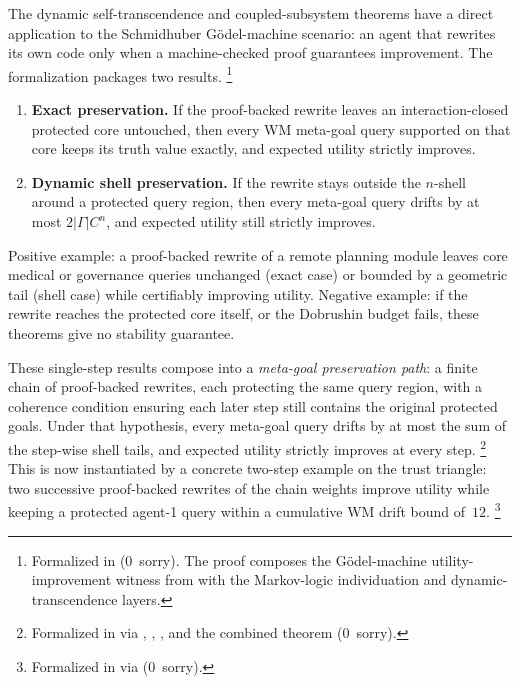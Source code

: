 \documentclass[11pt,openany]{report}
\begin{document}
The dynamic self-transcendence and coupled-subsystem theorems have a direct
application to the Schmidhuber
G\"odel-machine scenario: an agent that rewrites its own code only when a
machine-checked proof guarantees improvement.  The formalization packages
two results.%
\footnote{Formalized in
(0~sorry).  The proof composes the G\"odel-machine utility-improvement
witness from 
with the Markov-logic individuation and dynamic-transcendence layers.}
\begin{enumerate}
\item \textbf{Exact preservation.}
  If the proof-backed rewrite leaves an interaction-closed protected core
  untouched, then every WM meta-goal query supported on that core keeps
  its truth value exactly, and expected utility strictly improves.
\item \textbf{Dynamic shell preservation.}
  If the rewrite stays outside the $n$-shell around a protected query
  region, then every meta-goal query drifts by at most $2|\Gamma|C^n$,
  and expected utility still strictly improves.
\end{enumerate}
\noindent
Positive example: a proof-backed rewrite of a remote planning module leaves
core medical or governance queries unchanged (exact case) or bounded by a
geometric tail (shell case) while certifiably improving utility.
Negative example: if the rewrite reaches the protected core itself, or the
Dobrushin budget fails, these theorems give no stability guarantee.

These single-step results compose into a \emph{meta-goal preservation path}:
a finite chain of proof-backed rewrites, each protecting the same query
region, with a coherence condition ensuring each later step still contains
the original protected goals.  Under that hypothesis, every meta-goal query
drifts by at most the sum of the step-wise shell tails, and expected utility
strictly improves at every step.%
\footnote{Formalized in
via ,
,
, and the combined theorem
(0~sorry).}
This is now instantiated by a concrete two-step example on the trust
triangle: two successive proof-backed rewrites of the chain weights improve
utility while keeping a protected agent-1 query within a cumulative WM
drift bound of~$12$.%
\footnote{Formalized in
via  (0~sorry).}
\end{document}
